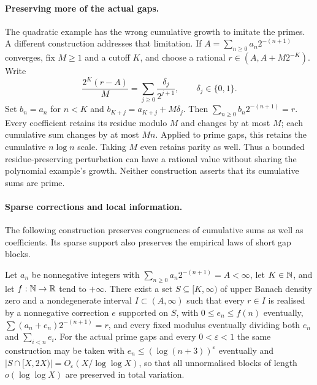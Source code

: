 \documentclass[11pt]{article}
\begin{document}
\paragraph{Preserving more of the actual gaps.}
The quadratic example has the wrong cumulative growth to imitate the primes.
A different construction addresses that limitation.  If
$A=\sum_{n\ge0}a_n2^{-(n+1)}$ converges, fix $M\ge1$ and a cutoff $K$, and
choose a rational $r\in(A,A+M2^{-K})$.  Write
\[
 \frac{2^K(r-A)}{M}=\sum_{j\ge0}\frac{\delta_j}{2^{j+1}},
 \qquad \delta_j\in\{0,1\}.
\]
Set $b_n=a_n$ for $n<K$ and $b_{K+j}=a_{K+j}+M\delta_j$.  Then
$\sum_{n\ge0}b_n2^{-(n+1)}=r$.  Every coefficient retains its residue
modulo $M$ and changes by at most $M$; each cumulative sum changes by at
most $Mn$.  Applied to prime gaps, this retains the cumulative
$n\log n$ scale.  Taking $M$ even retains parity as well.  Thus a bounded
residue-preserving perturbation can have a rational value without sharing
the polynomial example's growth.  Neither construction asserts that its
cumulative sums are prime.

\paragraph{Sparse corrections and local information.}
The following construction preserves congruences of cumulative sums as well
as coefficients.  Its sparse support also preserves the empirical laws of
short gap blocks.

\begin{proposition}\label{res:sparserationalisation}
Let $a_n$ be nonnegative integers with $\sum_{n\ge0}a_n2^{-(n+1)}=A<\infty$,
let $K\in\mathbb{N}$, and let $f:\mathbb{N}\to\mathbb{R}$ tend to $+\infty$.  There exist a set
$S\subseteq[K,\infty)$ of upper Banach density zero and a nondegenerate
interval $I\subset(A,\infty)$ such that every $r\in I$ is realised by a
nonnegative correction $e$ supported on $S$, with $0\le e_n\le f(n)$
eventually, $\sum(a_n+e_n)2^{-(n+1)}=r$, and every fixed modulus eventually
dividing both $e_n$ and $\sum_{i<n}e_i$.  For the actual prime gaps and
every $0<\varepsilon<1$ the same construction may be taken with
$e_n\le(\log(n+3))^\varepsilon$ eventually and
$|S\cap[X,2X)|=O_\varepsilon(X/\log\log X)$, so that all unnormalised blocks
of length $o(\log\log X)$ are preserved in total variation.
\end{proposition}
\end{document}
